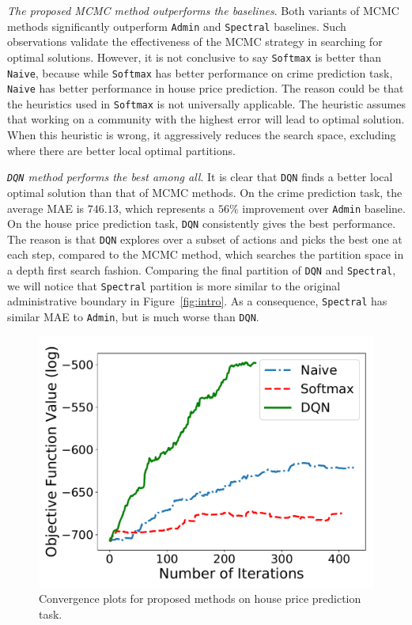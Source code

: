 \emph{The proposed MCMC method outperforms the baselines}. Both variants of MCMC methods significantly outperform  \texttt{Admin} and \texttt{Spectral} baselines. Such observations validate the effectiveness of the MCMC strategy in searching for optimal solutions. However, it is not conclusive to say \texttt{Softmax} is better than \texttt{Naive}, because while \texttt{Softmax} has better performance on crime prediction task,  \texttt{Naive} has better performance in house price prediction. The reason could be that the heuristics used in \texttt{Softmax} is not universally applicable. The heuristic assumes that working on a community with the highest error will lead to optimal solution. When this heuristic is wrong, it aggressively reduces the search space, excluding where there are better local optimal partitions. 



\emph{ \texttt{DQN} method performs the best among all}. It is clear that  \texttt{DQN} finds a better local optimal solution than that of MCMC methods. On the crime prediction task, the average MAE is $746.13$, which represents a $56\%$ improvement over  \texttt{Admin} baseline. On the house price prediction task, \texttt{DQN} consistently gives the best performance. The reason is that \texttt{DQN} explores over a subset of actions and picks the best one at each step, compared to the MCMC method, which searches the partition space in a depth first search fashion. Comparing the final partition of \texttt{DQN} and \texttt{Spectral}, we will notice that \texttt{Spectral} partition is more similar to the original administrative boundary in Figure~\ref{fig:intro}. As a consequence,  \texttt{Spectral} has similar MAE to \texttt{Admin}, but is much worse than \texttt{DQN}.


\begin{figure}[t!]
\centering
\includegraphics[width=0.9\linewidth]{fig/convergence-study.pdf}
\caption{Convergence plots for proposed methods on house price prediction task.}
\label{fig:convergence}
\end{figure}




